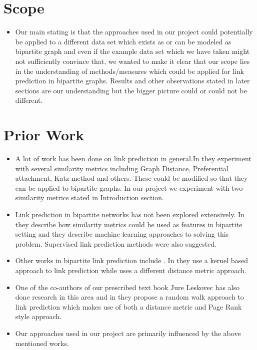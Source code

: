 \documentclass[letterpaper,twocolumn,11pt]{article}
\begin{document}
\section{Scope}

\begin{itemize}
\item[] Our main stating is that the approaches used in our project could potentially be applied to a different data set which exists as or can be modeled as bipartite graph and even if the example data set which we have taken might not sufficiently convince that, we wanted to make it clear that our scope lies in the understanding of methods/measures which could be applied for link prediction in bipartite graphs. Results and other observations stated in later sections are our understanding but the bigger picture could or could not be different. 
\end{itemize}

\section{Prior Work}

\begin{itemize}

\item A lot of work has been done on link prediction in general.In \cite{four} they experiment with several similarity metrics including Graph Distance, Preferential attachment, Katz method and others. These could be modified so that they can be applied to bipartite graphs. In our project we experiment with two similarity metrics stated in Introduction section.

\item Link prediction in bipartite networks has not been explored extensively. In \cite{five} they describe how similarity metrics could be used as features in bipartite setting and they describe machine learning approaches to solving this problem. Supervised link prediction methods were also suggested.

\item Other works in bipartite link prediction include \cite{two, three}. In \cite{two} they use a kernel based approach to link prediction while \cite{three} uses a different distance metric approach.

\item One of the co-authors of our prescribed text book Jure Leskovec has also done research in this area and in \cite{one} they propose a random walk approach to link prediction which makes use of both a distance metric and Page Rank style approach.

\item Our approaches used in our project are primarily influenced by the above mentioned works.

\end{itemize}
\end{document}
